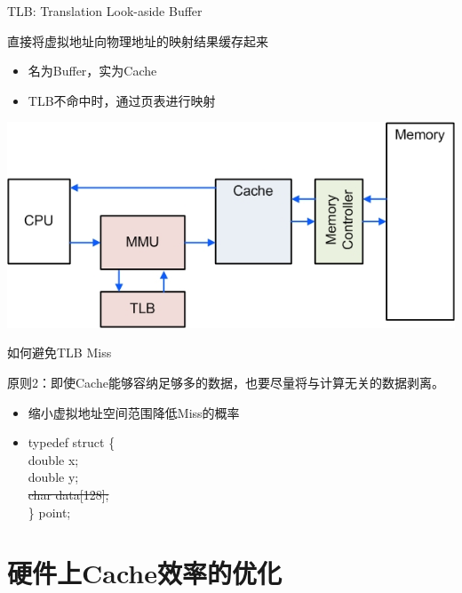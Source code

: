 \documentclass[handout]{beamer}
\begin{document}
\begin{CJK}{UTF8}{gbsn}
\begin{frame}{TLB: Translation Look-aside Buffer}
  \begin{block}{直接将虚拟地址向物理地址的映射结果缓存起来}
    \begin{itemize}
      \item {名为Buffer，实为Cache}
      \item {TLB不命中时，通过页表进行映射}
    \end{itemize}    
  \end{block}
  \begin{block}{}
    \begin{center}
      \includegraphics[scale=0.4]{./images/mmu-tlb}
    \end{center}
  \end{block}
\end{frame}

\begin{frame}{如何避免TLB Miss}
  \begin{block}{原则2：即使Cache能够容纳足够多的数据，也要尽量将与计算无关的数据剥离。}
    \begin{itemize}
      \item {缩小虚拟地址空间范围降低Miss的概率}
      \item {
          typedef struct \{ \\
            double x; \\
            double y; \\
            \sout{char data[128];} \\
          \} point;
        }
    \end{itemize}
  \end{block}
\end{frame}

\section{硬件上Cache效率的优化}


\end{CJK}
\end{document}
